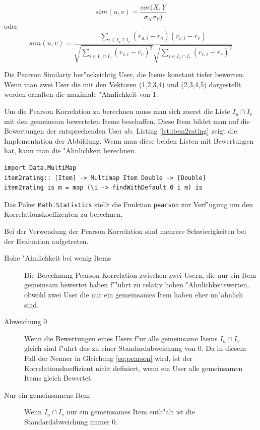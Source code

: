 \documentclass[a4paper, 12pt]{article}
\begin{document}
\begin{equation}
 sim(u,v) = \frac{cov(X,Y}{\sigma_X \sigma_Y)} 
\end{equation}
oder
\begin{equation}
  \label{eq:pearson}
  sim(u,v)  = \frac{\sum_{i \in I_u \cap I_v}(r_{u,i} - \bar{r}_u)(r_{v,i} - \bar{r}_v)}{\sqrt{\sum_{i \in I_u \cap I_v}( r_{v,i} - \bar{r}_v)^2}\sqrt{\sum_{i \in I_u \cap I_v}( r_{v,i} - \bar{r}_v)^2}}
\end{equation}

Die Pearson Similariy ber"ucksichtig User, die Items konstant tiefer bewerten. Wenn man zwei User die mit den Vektoren (1,2,3,4) und (2,3,4,5) dargestellt werden erhalten die maximale "Ahnlichkeit von 1.

Um die Pearson Korrelation zu berechnen muss man sich zuerst die Liste $I_u \cap I_v$ mit den gemeinsam bewerteten Items beschaffen. Diese Item bildet man auf die Bewertungen der entsprechenden User ab. Listing \ref{lst:item2rating} zeigt die Implementation der Abbildung. Wenn man diese beiden Listen mit Bewertungen hat, kann man die "Ahnlichkeit berechnen.

\begin{lstlisting}[caption=Implementation: Abbildung Items zu Bewertungen, label=lst:item2rating]
import Data.MultiMap
item2rating:: [Item] -> Multimap Item Double -> [Double]
item2rating is m = map (\i -> findWithDefault 0 i m) is
\end{lstlisting}

Das Paket \verb|Math.Statistics| stellt die Funktion \verb|pearson| zur Verf"ugung um den Korrelationskoeffizenten zu berechnen.

Bei der Verwendung der Pearson Korrelation sind mehrere Schwierigkeiten bei der Evaluation aufgetreten.

\begin{description}
\item[Hohe "Ahnlichkeit bei wenig Items] Die Berechnung Pearson Korrelation zwischen zwei Usern, die nur ein Item gemeinsam bewertet haben f""uhrt zu relativ hohen "Ahnlichkeitswerten, obwohl zwei User die nur ein gemeinsames Item haben eher un"ahnlich sind.
\item[Abweichung 0] Wenn die Bewertungen eines Users f"ur alle gemeinsame Items  $I_u \cap I_v$ gleich sind f"uhrt das zu einer Standardabweichung von 0. Da in diesem Fall der Nenner in Gleichung \ref{eq:pearson} wird, ist der Korrelationskoeffizient nicht definiert, wenn ein User alle gemeinsamen Items gleich Bewertet.
\item[Nur ein gemeinsamens Item] Wenn  $I_u \cap I_v$ nur ein gemeinsames Item enth"alt ist die Standardabweichung immer 0.
\end{description}
\end{document}
